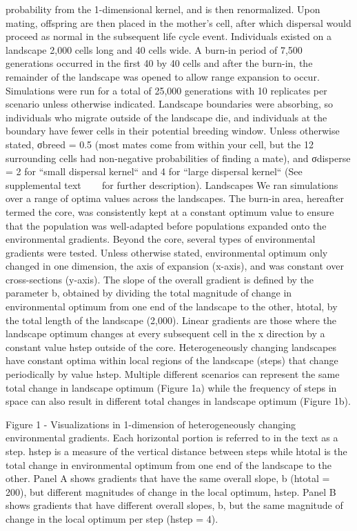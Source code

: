 probability from the 1-dimensional kernel, and is then renormalized. Upon mating, offspring 
are then placed in the mother’s cell, after which dispersal would proceed as normal in the 
subsequent life cycle event.
Individuals existed on a landscape 2,000 cells long and 40 cells wide. A burn-in period 
of 7,500 generations occurred in the first 40 by 40 cells and after the burn-in, the 
remainder of the landscape was opened to allow range expansion to occur. Simulations 
were run for a total of 25,000 generations with 10 replicates per scenario unless otherwise 
indicated. Landscape boundaries were absorbing, so individuals who migrate outside of the 
landscape die, and individuals at the boundary have fewer cells in their potential breeding 
window. Unless otherwise stated, σbreed = 0.5 (most mates come from within your cell, but 
the 12 surrounding cells had non-negative probabilities of finding a mate), and σdisperse = 2 
for ``small dispersal kernel`` and 4 for ``large dispersal kernel`` (See supplemental text ~~~ for 
further description). 
Landscapes
We ran simulations over a range of optima values across the landscapes. The burn-in area, 
hereafter termed the core, was consistently kept at a constant optimum value to ensure that 
the population was well-adapted before populations expanded onto the environmental gradients. 
Beyond the core, several types of environmental gradients were tested. Unless otherwise stated, 
environmental optimum only changed in one dimension, the axis of expansion (x-axis), and was 
constant over cross-sections (y-axis). The slope of the overall gradient is defined by the 
parameter b, obtained by dividing the total magnitude of change in environmental optimum 
from one end of the landscape to the other, htotal, by the total length of the landscape (2,000). 
Linear gradients are those where the landscape optimum changes at every subsequent cell in the x 
direction by a constant value hstep outside of the core. Heterogeneously changing landscapes have 
constant optima within local regions of the landscape (steps) that change periodically by value hstep. 
Multiple different scenarios can represent the same total change in landscape optimum (Figure 1a) 
while the frequency of steps in space can also result in different total changes in landscape 
optimum (Figure 1b).

Figure 1 - Visualizations in 1-dimension of heterogeneously changing environmental gradients. 
Each horizontal portion is referred to in the text as a step. hstep is a measure of the vertical 
distance between steps while htotal is the total change in environmental optimum from one end 
of the landscape to the other. Panel A shows gradients that have the same overall slope, b (htotal = 200), 
but different magnitudes of change in the local optimum, hstep. Panel B shows gradients that 
have different overall slopes, b, but the same magnitude of change in the local optimum per 
step (hstep = 4).

